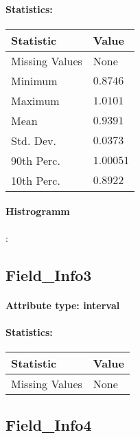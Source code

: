 \paragraph{Statistics: }
\begin{table}[H]
	\renewcommand{\arraystretch}{1.25}
	\begin{tabular}{l|l}
		\textbf{Statistic} & \textbf{Value}\\\hline
			Missing Values& None\\\hline
			Minimum& $0.8746$\\\hline
			Maximum& $1.0101$\\\hline
			Mean& $0.9391$\\\hline
			Std. Dev.& $0.0373$\\\hline
			90th Perc. & $1.00051$\\\hline
			10th Perc. & $0.8922$ \\
	\end{tabular}
\end{table}

\paragraph{Histrogramm}:

\subsection{Field\_Info3}
\paragraph{Attribute type: interval}
\paragraph{Statistics: }
\begin{table}[H]
	\renewcommand{\arraystretch}{1.25}
	\begin{tabular}{l|l}
		\textbf{Statistic} & \textbf{Value}\\\hline
		Missing Values& None\\\hline
	\end{tabular}
\end{table}

\subsection{Field\_Info4}
